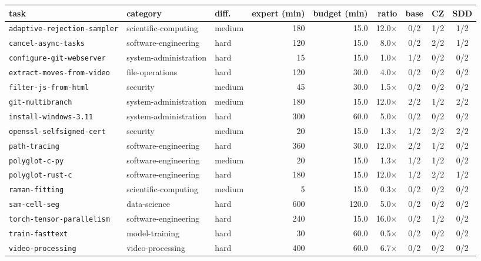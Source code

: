 
\begin{tabular}{@{}lllrrrccc@{}}
\toprule
task & category & diff. & expert (min) & budget (min) & ratio & base & CZ & SDD \\
\midrule
\texttt{\footnotesize adaptive-rejection-sampler} & scientific-computing & medium & 180 & 15.0 & 12.0$\times$ & 0/2 & 1/2 & 1/2 \\
\texttt{\footnotesize cancel-async-tasks} & software-engineering & hard & 120 & 15.0 & 8.0$\times$ & 0/2 & 2/2 & 1/2 \\
\texttt{\footnotesize configure-git-webserver} & system-administration & hard & 15 & 15.0 & 1.0$\times$ & 1/2 & 0/2 & 0/2 \\
\texttt{\footnotesize extract-moves-from-video} & file-operations & hard & 120 & 30.0 & 4.0$\times$ & 0/2 & 0/2 & 0/2 \\
\texttt{\footnotesize filter-js-from-html} & security & medium & 45 & 30.0 & 1.5$\times$ & 0/2 & 0/2 & 0/2 \\
\texttt{\footnotesize git-multibranch} & system-administration & medium & 180 & 15.0 & 12.0$\times$ & 2/2 & 1/2 & 2/2 \\
\texttt{\footnotesize install-windows-3.11} & system-administration & hard & 300 & 60.0 & 5.0$\times$ & 0/2 & 0/2 & 0/2 \\
\texttt{\footnotesize openssl-selfsigned-cert} & security & medium & 20 & 15.0 & 1.3$\times$ & 1/2 & 2/2 & 2/2 \\
\texttt{\footnotesize path-tracing} & software-engineering & hard & 360 & 30.0 & 12.0$\times$ & 2/2 & 1/2 & 0/2 \\
\texttt{\footnotesize polyglot-c-py} & software-engineering & medium & 20 & 15.0 & 1.3$\times$ & 1/2 & 1/2 & 0/2 \\
\texttt{\footnotesize polyglot-rust-c} & software-engineering & hard & 180 & 15.0 & 12.0$\times$ & 1/2 & 2/2 & 1/2 \\
\texttt{\footnotesize raman-fitting} & scientific-computing & medium & 5 & 15.0 & 0.3$\times$ & 0/2 & 0/2 & 0/2 \\
\texttt{\footnotesize sam-cell-seg} & data-science & hard & 600 & 120.0 & 5.0$\times$ & 0/2 & 0/2 & 0/2 \\
\texttt{\footnotesize torch-tensor-parallelism} & software-engineering & hard & 240 & 15.0 & 16.0$\times$ & 0/2 & 1/2 & 0/2 \\
\texttt{\footnotesize train-fasttext} & model-training & hard & 30 & 60.0 & 0.5$\times$ & 0/2 & 0/2 & 0/2 \\
\texttt{\footnotesize video-processing} & video-processing & hard & 400 & 60.0 & 6.7$\times$ & 0/2 & 0/2 & 0/2 \\
\bottomrule
\end{tabular}
